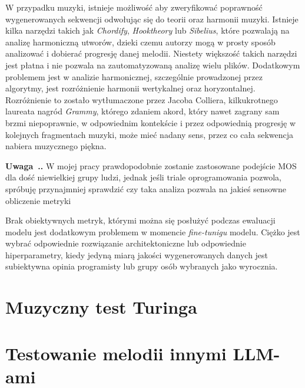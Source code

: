 \documentclass[data-science]{agh-wi} %
\newcounter{comment}[chapter]
\newenvironment{comment}[1][]{\begin{shaded}\refstepcounter{comment}
\noindent \textbf{Uwaga~\thechapter.\thecomment. #1} \rmfamily}{\end{shaded}}
\begin{document}
W przypadku muzyki, istnieje możliwość aby zweryfikować poprawność wygenerowanych sekwencji odwołując się do teorii oraz harmonii muzyki. Istnieje kilka narzędzi takich jak \textit{Chordify}, \textit{Hooktheory} lub \textit{Sibelius}, które pozwalają na analizę harmoniczną utworów, dzieki czemu autorzy mogą w prosty sposób analizować i dobierać progresję danej melodii. Niestety większość takich narzędzi jest płatna i nie pozwala na zautomatyzowaną analizę wielu plików. Dodatkowym problemem jest w analizie harmonicznej, szczególnie prowadzonej przez algorytmy, jest rozróżnienie harmonii wertykalnej oraz horyzontalnej. Rozróżnienie to zostało wytłumaczone przez Jacoba Colliera, kilkukrotnego laureata nagród \textit{Grammy}, którego zdaniem akord, który nawet zagrany sam brzmi niepoprawnie, w odpowiednim kontekście i przez odpowiednią progresję w kolejnych fragmentach muzyki, może mieć nadany sens, przez co cała sekwencja nabiera muzycznego piękna\cite{collier_wrongnote}.
\begin{comment}
W mojej pracy prawdopodobnie zostanie zastosowane podejście MOS dla dość niewielkiej grupy ludzi, jednak jeśli triale oprogramowania pozwola, spróbuję przynajmniej sprawdzić czy taka analiza pozwala na jakieś sensowne obliczenie metryki
\end{comment}
Brak obiektywnych metryk, którymi można się posłużyć podczas ewaluacji modelu jest dodatkowym problemem w momencie \textit{fine-tunigu} modelu. Ciężko jest wybrać odpowiednie rozwiązanie architektoniczne lub odpowiednie hiperparametry, kiedy jedyną miarą jakości wygenerowanych danych jest subiektywna opinia programisty lub grupy osób wybranych jako wyrocznia.

\section{Muzyczny test Turinga}
\cite{music_turing_test}

\section{Testowanie melodii innymi LLM-ami}
\end{document}
